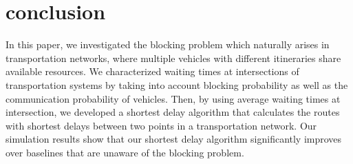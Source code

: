 \documentclass[conference]{IEEEtran}
\begin{document}
\section{conclusion}\label{sec:conclusion}
In this paper, we investigated the blocking problem which naturally arises in transportation networks, where multiple vehicles with different itineraries share available resources. We characterized waiting times at intersections of transportation systems by taking into account blocking probability as well as the communication probability of vehicles. Then, by using average waiting times at intersection, we developed a shortest delay algorithm that calculates the routes with shortest delays between two points in a transportation network. Our simulation results show that our shortest delay algorithm significantly improves over baselines that are unaware of the blocking problem.
\end{document}
